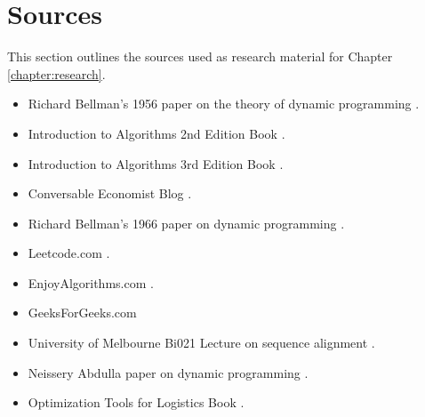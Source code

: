 \section{Sources}\label{sec:sources}
This section outlines the sources used as research material for Chapter \ref{chapter:research}.
\begin{itemize}
    \item Richard Bellman's 1956 paper on the theory of dynamic programming \cite{bellman1954theory}.
    \item Introduction to Algorithms 2nd Edition Book \cite{algosbook1}.
    \item Introduction to Algorithms 3rd Edition Book \cite{algosbook2}.
    \item Conversable Economist Blog \cite{conversableeconomist}.
    \item Richard Bellman's 1966 paper on dynamic programming \cite{bellman1966dynamic}.
    \item Leetcode.com \cite{leetcode}.
    \item EnjoyAlgorithms.com \cite{enjoyalgorithms}.
    \item GeeksForGeeks.com \cite{geeksforgeeks}
    \item University of Melbourne Bi021 Lecture on sequence alignment \cite{likic2008needleman}.
    \item Neissery Abdulla paper on dynamic programming \cite{abdulla2018dynamic}.
    \item Optimization Tools for Logistics Book \cite{REVEILLAC201555}.
\end{itemize}



